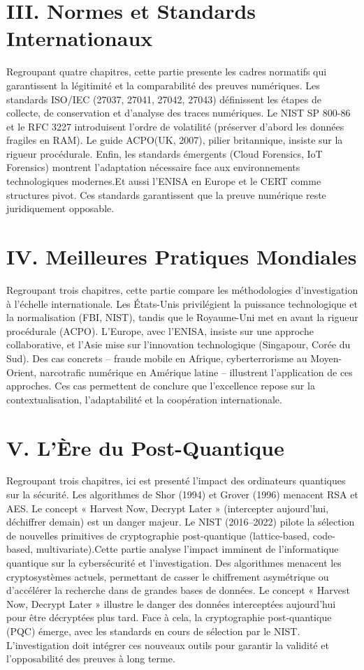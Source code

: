 \documentclass[12pt,a4paper]{article}
\begin{document}
	\section*{III. Normes et Standards Internationaux}
	Regroupant quatre chapitres, cette partie presente les cadres normatifs qui garantissent la légitimité et la comparabilité des preuves numériques. Les standards ISO/IEC (27037, 27041, 27042, 27043) définissent les étapes de collecte, de conservation et d’analyse des traces numériques. Le NIST SP 800-86 et le RFC 3227 introduisent l’ordre de volatilité (préserver d’abord les données fragiles en RAM). Le guide ACPO(UK, 2007), pilier britannique, insiste sur la rigueur procédurale. Enfin, les standards émergents (Cloud Forensics, IoT Forensics) montrent l’adaptation nécessaire face aux environnements technologiques modernes.Et aussi l’ENISA en Europe et le CERT comme structures pivot. Ces standards garantissent que la preuve numérique reste juridiquement opposable.
	
	\section*{IV. Meilleures Pratiques Mondiales}
	Regroupant trois chapitres, cette partie compare les méthodologies d’investigation à l’échelle internationale. Les États-Unis privilégient la puissance technologique et la normalisation (FBI, NIST), tandis que le Royaume-Uni met en avant la rigueur procédurale (ACPO). L’Europe, avec l’ENISA, insiste sur une approche collaborative, et l’Asie mise sur l’innovation technologique (Singapour, Corée du Sud). Des cas concrets – fraude mobile en Afrique, cyberterrorisme au Moyen-Orient, narcotrafic numérique en Amérique latine – illustrent l’application de ces approches. Ces cas permettent de conclure que l’excellence repose sur la contextualisation, l’adaptabilité et la coopération internationale.
	
	\section*{V. L’Ère du Post-Quantique}
	Regroupant trois chapitres, ici est presenté l’impact des ordinateurs quantiques sur la sécurité. Les algorithmes de Shor (1994) et Grover (1996) menacent RSA et AES. Le concept « Harvest Now, Decrypt Later » (intercepter aujourd’hui, déchiffrer demain) est un danger majeur. Le NIST (2016–2022) pilote la sélection de nouvelles primitives de cryptographie post-quantique (lattice-based, code-based, multivariate).Cette partie analyse l’impact imminent de l’informatique quantique sur la cybersécurité et l’investigation. Des algorithmes  menacent les cryptosystèmes actuels, permettant de casser le chiffrement asymétrique ou d’accélérer la recherche dans de grandes bases de données. Le concept « Harvest Now, Decrypt Later » illustre le danger des données interceptées aujourd’hui pour être décryptées plus tard. Face à cela, la cryptographie post-quantique (PQC) émerge, avec les standards en cours de sélection par le NIST. L’investigation doit intégrer ces nouveaux outils pour garantir la validité et l’opposabilité des preuves à long terme.
	
\end{document}
